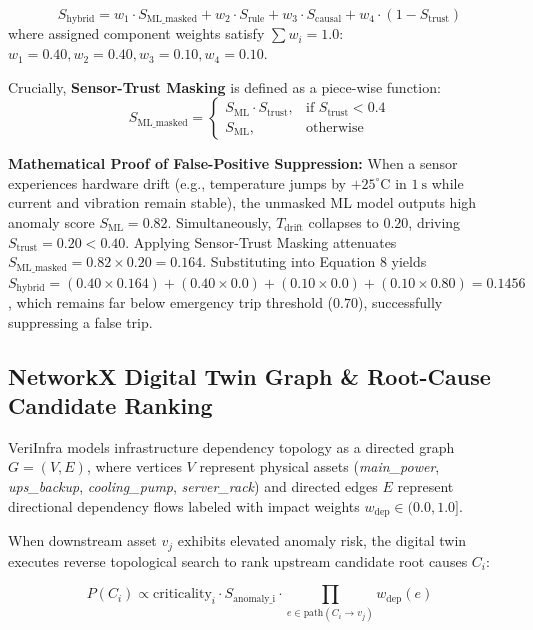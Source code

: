 \documentclass[conference]{IEEEtran}
\begin{document}
\begin{equation}
S_{\text{hybrid}} = w_1 \cdot S_{\text{ML\_masked}} + w_2 \cdot S_{\text{rule}} + w_3 \cdot S_{\text{causal}} + w_4 \cdot (1 - S_{\text{trust}})
\end{equation}
where assigned component weights satisfy $\sum w_i = 1.0$: $w_1 = 0.40, w_2 = 0.40, w_3 = 0.10, w_4 = 0.10$.

Crucially, \textbf{Sensor-Trust Masking} is defined as a piece-wise function:
\begin{equation}
S_{\text{ML\_masked}} = 
\begin{cases} 
S_{\text{ML}} \cdot S_{\text{trust}}, & \text{if } S_{\text{trust}} < 0.4 \\
S_{\text{ML}}, & \text{otherwise}
\end{cases}
\end{equation}

\textbf{Mathematical Proof of False-Positive Suppression:} When a sensor experiences hardware drift (e.g., temperature jumps by $+25^\circ\text{C}$ in $1~\text{s}$ while current and vibration remain stable), the unmasked ML model outputs high anomaly score $S_{\text{ML}} = 0.82$. Simultaneously, $T_{\text{drift}}$ collapses to $0.20$, driving $S_{\text{trust}} = 0.20 < 0.40$. Applying Sensor-Trust Masking attenuates $S_{\text{ML\_masked}} = 0.82 \times 0.20 = 0.164$. Substituting into Equation 8 yields $S_{\text{hybrid}} = (0.40 \times 0.164) + (0.40 \times 0.0) + (0.10 \times 0.0) + (0.10 \times 0.80) = 0.1456$, which remains far below emergency trip threshold ($0.70$), successfully suppressing a false trip.

\subsection{NetworkX Digital Twin Graph \& Root-Cause Candidate Ranking}
VeriInfra models infrastructure dependency topology as a directed graph $G = (V, E)$, where vertices $V$ represent physical assets (\textit{main\_power}, \textit{ups\_backup}, \textit{cooling\_pump}, \textit{server\_rack}) and directed edges $E$ represent directional dependency flows labeled with impact weights $w_{\text{dep}} \in (0.0, 1.0]$.

When downstream asset $v_j$ exhibits elevated anomaly risk, the digital twin executes reverse topological search to rank upstream candidate root causes $C_i$:

\begin{equation}
P(C_i) \propto \text{criticality}_i \cdot S_{\text{anomaly\_i}} \cdot \prod_{e \in \text{path}(C_i \to v_j)} w_{\text{dep}}(e)
\end{equation}
\end{document}
